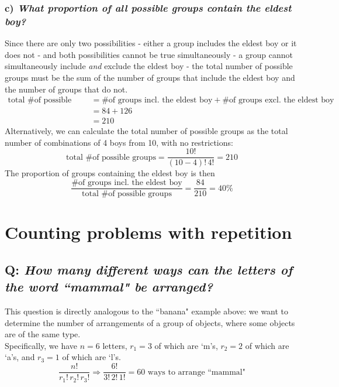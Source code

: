 \documentclass{article}
\begin{document}
\subsubsection*{c) {\em What proportion of all possible groups contain the eldest boy?}}
Since there are only two possibilities - either a group includes the eldest boy or it does not - and both possibilities cannot be true simultaneously - a group cannot simultaneously include \textit{and} exclude the eldest boy - the total number of possible groups must be the sum of the number of groups that include the eldest boy and the number of groups that do not.
\begin{align*}
\text{total \# of possible groups}& =\text{\# of groups incl. the eldest boy}+\text{\# of groups excl. the eldest boy}\\
& =84+126\\
& =210
\end{align*}
Alternatively, we can calculate the total number of possible groups as the total number of combinations of 4 boys from 10, with no restrictions:
\begin{equation*}
\text{total \# of possible groups}=\dfrac{10!}{(10-4)!\,4!}=210
\end{equation*}
The proportion of groups containing the eldest boy is then
\begin{equation*}
\dfrac{\text{\# of groups incl. the eldest boy}}{\text{total \# of possible groups}}=\dfrac{84}{210}=40\%
\end{equation*}

\section{\sc Counting problems with repetition}

\subsection*{Q: {\em How many different ways can the letters of the word ``mammal" be arranged?}}
This question is directly analogous to the ``banana" example above: we want to determine the number of arrangements of a group of objects, where some objects are of the same type.\\[1ex]
Specifically, we have $n=6$ letters, $r_1=3$ of which are `m's, $r_2=2$ of which are `a's, and $r_3=1$ of which are `l's.
\begin{equation*}
\dfrac{n!}{r_1!\,r_2!\,r_3!}\Rightarrow\dfrac{6!}{3!\,2!\,1!}=60\text{ ways to arrange ``mammal"}
\end{equation*}
\end{document}
